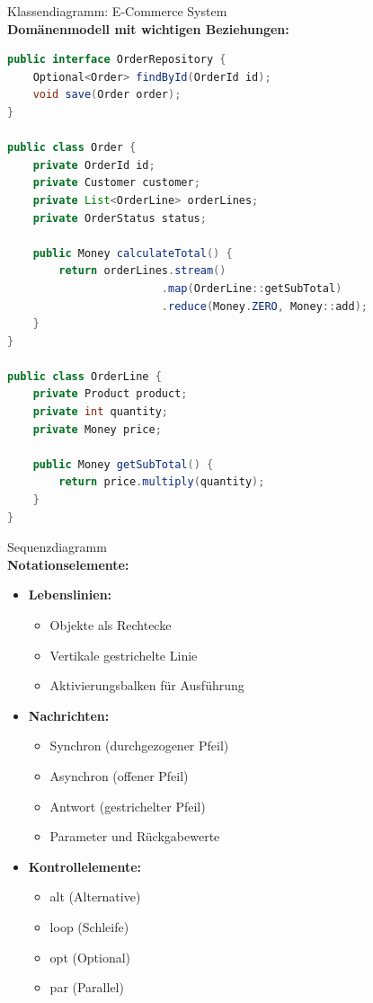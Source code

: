 \begin{example2}{Klassendiagramm: E-Commerce System}\\
\textbf{Domänenmodell mit wichtigen Beziehungen:}

\begin{lstlisting}[language=Java, style=basesmol]
public interface OrderRepository {
    Optional<Order> findById(OrderId id);
    void save(Order order);
}

public class Order {
    private OrderId id;
    private Customer customer;
    private List<OrderLine> orderLines;
    private OrderStatus status;
    
    public Money calculateTotal() {
        return orderLines.stream()
                        .map(OrderLine::getSubTotal)
                        .reduce(Money.ZERO, Money::add);
    }
}

public class OrderLine {
    private Product product;
    private int quantity;
    private Money price;
    
    public Money getSubTotal() {
        return price.multiply(quantity);
    }
}
\end{lstlisting}
\end{example2}

\begin{definition}{Sequenzdiagramm}\\
\textbf{Notationselemente:}
\begin{itemize}
    \item \textbf{Lebenslinien:}
    \begin{itemize}
        \item Objekte als Rechtecke
        \item Vertikale gestrichelte Linie
        \item Aktivierungsbalken für Ausführung
    \end{itemize}
    
    \item \textbf{Nachrichten:}
    \begin{itemize}
        \item Synchron (durchgezogener Pfeil)
        \item Asynchron (offener Pfeil)
        \item Antwort (gestrichelter Pfeil)
        \item Parameter und Rückgabewerte
    \end{itemize}
    
    \item \textbf{Kontrollelemente:}
    \begin{itemize}
        \item alt (Alternative)
        \item loop (Schleife)
        \item opt (Optional)
        \item par (Parallel)
    \end{itemize}
\end{itemize}
\end{definition}

